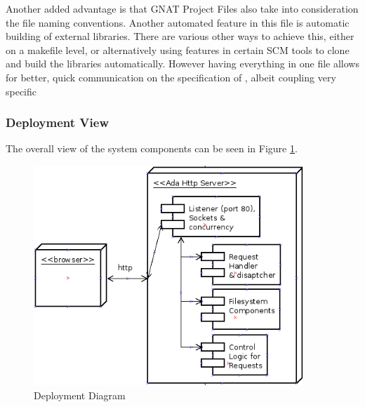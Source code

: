 Another added advantage is that GNAT Project Files also take into consideration 
the file naming conventions. Another automated feature in this file is automatic
building of external libraries. There are various other ways to achieve this,
either on a makefile level, or alternatively using features in certain SCM tools
to clone and build the libraries automatically. However having everything in one
file allows for better, quick communication on the specification of ,
albeit coupling very specific 

\subsubsection{Deployment View}
The overall view of the system components can be seen in Figure \ref{fig:deployment}. 

\begin{figure}[hb]
\centering
\includegraphics[width=4in]{gfx/deployment.png}
\caption{Deployment Diagram}
\label{fig:deployment}
\end{figure}




